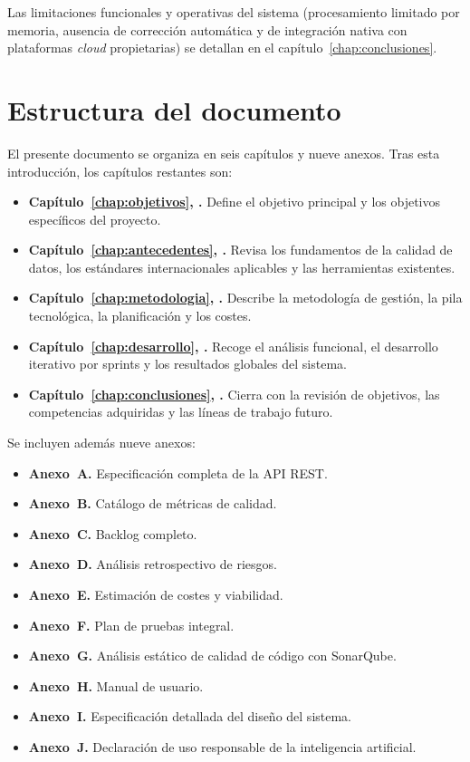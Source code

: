 Las limitaciones funcionales y operativas del sistema (procesamiento
limitado por memoria, ausencia de corrección automática y de
integración nativa con plataformas \emph{cloud} propietarias) se
detallan en el capítulo~\ref{chap:conclusiones}.

\section{Estructura del documento}
\label{sec:estructura}

El presente documento se organiza en seis capítulos y nueve anexos.
Tras esta introducción, los capítulos restantes son:

\begin{itemize}
  \item \textbf{Capítulo~\ref{chap:objetivos}, .}
        Define el objetivo principal y los objetivos específicos del
        proyecto.
  \item \textbf{Capítulo~\ref{chap:antecedentes},
        .} Revisa los fundamentos de la calidad
        de datos, los estándares internacionales aplicables y las
        herramientas existentes.
  \item \textbf{Capítulo~\ref{chap:metodologia},
        .} Describe la metodología de gestión, la
        pila tecnológica, la planificación y los costes.
  \item \textbf{Capítulo~\ref{chap:desarrollo},
        .} Recoge el análisis funcional, el
        desarrollo iterativo por sprints y los resultados globales del
        sistema.
  \item \textbf{Capítulo~\ref{chap:conclusiones},
        .} Cierra con la revisión de objetivos,
        las competencias adquiridas y las líneas de trabajo futuro.
\end{itemize}

Se incluyen además nueve anexos:

\begin{itemize}
  \item \textbf{Anexo~A.} Especificación completa de la \ac{API} \ac{REST}.
  \item \textbf{Anexo~B.} Catálogo de métricas de calidad.
  \item \textbf{Anexo~C.} Backlog completo.
  \item \textbf{Anexo~D.} Análisis retrospectivo de riesgos.
  \item \textbf{Anexo~E.} Estimación de costes y viabilidad.
  \item \textbf{Anexo~F.} Plan de pruebas integral.
  \item \textbf{Anexo~G.} Análisis estático de calidad de código con SonarQube.
  \item \textbf{Anexo~H.} Manual de usuario.
  \item \textbf{Anexo~I.} Especificación detallada del diseño del sistema.
  \item \textbf{Anexo~J.} Declaración de uso responsable de la inteligencia artificial.
\end{itemize}


